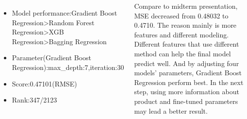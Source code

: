 \documentclass{tikzposter} %
\begin{document}
\begin{columns}
{}


{
\begin{itemize}
	\item Model performance:Gradient Boost Regression>Random Forest Regression>XGB Regression>Bagging Regression
	\item Parameter(Gradient Boost Regression):max\_depth:7,iteration:30
	\item Score:0.47101(RMSE)
	\item Rank:347/2123
\end{itemize}
}


{
 Compare to midterm presentation, MSE decreased from 0.48032 to 0.4710. The reason mainly is more features and different modeling. Different features that use different method can help the final model predict well. And by adjusting four models' parameters, Gradient Boost Regression perform best. In the next step, using more information about product and fine-tuned parameters may lead a better result. 

}





\end{columns}


\end{document}

